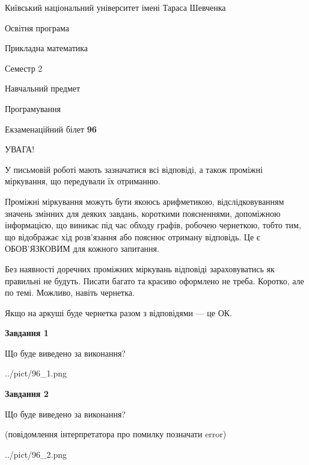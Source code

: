 \documentclass[12pt, ukrainian]{article}
\begin{document}
{{\begin {small}\par
{ \center  Київський національний університет імені Тараса Шевченка \par}
{\parbox {5 cm}{Освітня програма \hfill}{\parbox {7 cm}{Прикладна математика\hfill}}\parbox {6 cm}{\hfill Семестр 2}}\par
{\parbox {5 cm} {Навчальний предмет \hfill}\parbox {7 cm}{Програмування \hfill}\parbox {6cm}{\hfill}\par}\vspace{-7pt} \end{small}}{\center Екзаменаційний білет \No \textbf
{ 96 }\par}}
{
\begin {large}
УВАГА!

У письмовій роботі мають зазначатися всі відповіді, а також проміжні міркування, що передували їх отриманню.

Проміжні міркування можуть бути якоюсь арифметикою, відслідковуванням зна\-чень змінних для деяких завдань,
короткими поясненнями, допоміжною інформацією, що виникає під час обходу графів, робочею чернеткою,
тобто тим, що відображає хід розв’язання або пояснює отриману відповідь.
Це є ОБОВ’ЯЗКОВИМ для кожного запитання.

Без наявності доречних проміжних міркувань відповіді зараховуватись як правиль\-ні не будуть.
Писати багато та красиво оформлено не треба. Коротко, але по темі. Можли\-во, навіть чернетка.

Якщо на аркуші буде чернетка разом з відповідями --- це ОК.

\newpage

{\begin {center}\textbf{Завдання 1}\end {center}}\par
Що буде виведено за виконання?\par
\begin{center}
	{../pict/96_1.png}
\end{center}
\newpage

{\begin {center}\textbf{Завдання 2}\end {center}}\par
Що буде виведено за виконання?\par
 (повідомлення інтерпретатора про помилку позначати error)\par
\begin{center}
	{../pict/96_2.png}
\end{center}
\newpage


\end{large}}
\end{document}

